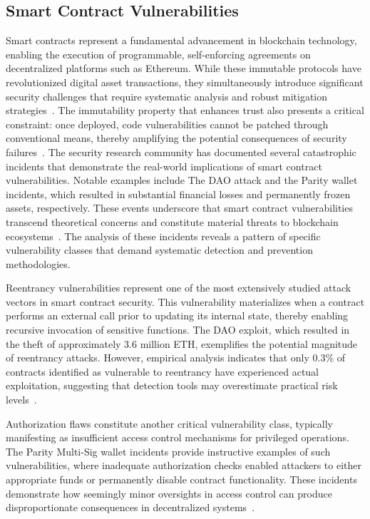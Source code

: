 \subsection{Smart Contract Vulnerabilities}
Smart contracts represent a fundamental advancement in blockchain technology, enabling the execution of programmable, self-enforcing agreements on decentralized platforms such as Ethereum. While these immutable protocols have revolutionized digital asset transactions, they simultaneously introduce significant security challenges that require systematic analysis and robust mitigation strategies~\cite{perez2021analysis}. The immutability property that enhances trust also presents a critical constraint: once deployed, code vulnerabilities cannot be patched through conventional means, thereby amplifying the potential consequences of security failures~\cite{praitheeshan2019systematic}.
The security research community has documented several catastrophic incidents that demonstrate the real-world implications of smart contract vulnerabilities. Notable examples include The DAO attack and the Parity wallet incidents, which resulted in substantial financial losses and permanently frozen assets, respectively. These events underscore that smart contract vulnerabilities transcend theoretical concerns and constitute material threats to blockchain ecosystems~\cite{perez2021analysis}. The analysis of these incidents reveals a pattern of specific vulnerability classes that demand systematic detection and prevention methodologies.

Reentrancy vulnerabilities represent one of the most extensively studied attack vectors in smart contract security. This vulnerability materializes when a contract performs an external call prior to updating its internal state, thereby enabling recursive invocation of sensitive functions. The DAO exploit, which resulted in the theft of approximately 3.6 million ETH, exemplifies the potential magnitude of reentrancy attacks. However, empirical analysis indicates that only 0.3\% of contracts identified as vulnerable to reentrancy have experienced actual exploitation, suggesting that detection tools may overestimate practical risk levels~\cite{perez2021analysis, perez2020analysis}.

Authorization flaws constitute another critical vulnerability class, typically manifesting as insufficient access control mechanisms for privileged operations. The Parity Multi-Sig wallet incidents provide instructive examples of such vulnerabilities, where inadequate authorization checks enabled attackers to either appropriate funds or permanently disable contract functionality. These incidents demonstrate how seemingly minor oversights in access control can produce disproportionate consequences in decentralized systems~\cite{praitheeshan2019systematic}.

